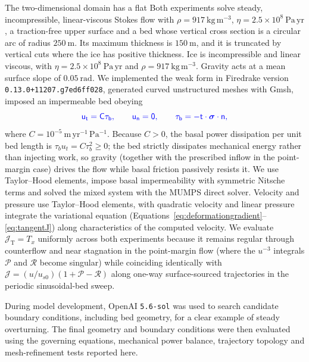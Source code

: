 \documentclass[review]{igs}
\providecommand{\DIFadd}[1]{{\protect\color{blue} \sf #1}} %
\providecommand{\DIFdel}[1]{{\protect\color{red} \scriptsize #1}} %
\providecommand{\DIFaddbegin}{} %
\providecommand{\DIFaddend}{} %
\providecommand{\DIFdelbegin}{} %
\providecommand{\DIFdelend}{} %
\newcommand{\DIFscaledelfig}{0.5}
\newlength{\DIFdelgraphicswidth} %
\newlength{\DIFdelgraphicsheight} %
\newcommand{\DIFaddincludegraphics}[2][]{{\color{blue}\fbox{\DIFOincludegraphics[#1]{#2}}}} %
\newcommand{\DIFdelincludegraphics}[2][]{%
\sbox{\DIFdelgraphicsbox}{\DIFOincludegraphics[#1]{#2}}%
\settoboxwidth{\DIFdelgraphicswidth}{\DIFdelgraphicsbox} %
\settoboxtotalheight{\DIFdelgraphicsheight}{\DIFdelgraphicsbox} %
\scalebox{\DIFscaledelfig}{%
\parbox[b]{\DIFdelgraphicswidth}{\usebox{\DIFdelgraphicsbox}\\[-\baselineskip] \rule{\DIFdelgraphicswidth}{0em}}\llap{\resizebox{\DIFdelgraphicswidth}{\DIFdelgraphicsheight}{%
\setlength{\unitlength}{\DIFdelgraphicswidth}%
\begin{picture}(1,1)%
\thicklines\linethickness{2pt} %
{\color[rgb]{1,0,0}\put(0,0){\framebox(1,1){}}}%
{\color[rgb]{1,0,0}\put(0,0){\line( 1,1){1}}}%
{\color[rgb]{1,0,0}\put(0,1){\line(1,-1){1}}}%
\end{picture}%
}\hspace*{3pt}}} %
} %
\DeclareRobustCommand{\DIFaddbegin}{\DIFOaddbegin \let\includegraphics\DIFaddincludegraphics} %
\DeclareRobustCommand{\DIFaddend}{\DIFOaddend \let\includegraphics\DIFOincludegraphics} %
\DeclareRobustCommand{\DIFdelbegin}{\DIFOdelbegin \let\includegraphics\DIFdelincludegraphics} %
\DeclareRobustCommand{\DIFdelend}{\DIFOaddend \let\includegraphics\DIFOincludegraphics} %
\begin{document}
\DIFdel{The two-dimensional domain has a flat }\DIFdelend \DIFaddbegin \DIFadd{Both experiments solve steady, incompressible, linear-viscous Stokes flow with \(\rho=917~\mathrm{kg\,m^{-3}}\), \(\eta=2.5\times10^8~\mathrm{Pa\,yr}\), a traction-free }\DIFaddend upper surface and \DIFdelbegin \DIFdel{a bed whose vertical cross section is a circular arc of radius \(250~\mathrm{m}\). Its maximum thickness is \(150~\mathrm{m}\), and it is truncated by vertical cuts where the ice has positive thickness. Ice is incompressible and linear viscous, with \(\eta=2.5\times10^8~\mathrm{Pa\,yr}\) and \(\rho=917~\mathrm{kg\,m^{-3}}\). Gravity acts at a mean surface slope of \(0.05~\mathrm{rad}\). We implemented the weak form in Firedrake version \texttt{0.13.0+11207.g7ed6ff028}, generated curved unstructured meshes with Gmsh, imposed }\DIFdelend \DIFaddbegin \DIFadd{an impermeable bed obeying
}\begin{equation}
\DIFadd{u_t=C\tau_b,
\qquad
u_n=0,
\qquad
\tau_b=-\bm{t}\mathbin{\cdot}\bm{\sigma}\mathbin{\cdot}\bm{n},
\label{eq:linearsliding}
}\end{equation}
\DIFadd{where \(C=10^{-5}~\mathrm{m\,yr^{-1}\,Pa^{-1}}\). Because \(C>0\), the basal power dissipation per unit bed length is \(\tau_b u_t=C\tau_b^2\geq0\); the bed strictly dissipates mechanical energy rather than injecting work, so gravity (together with the prescribed inflow in the point-margin case) drives the flow while basal friction passively resists it. We use Taylor--Hood elements, impose }\DIFaddend basal impermeability with symmetric Nitsche terms and \DIFdelbegin \DIFdel{solved the mixed system with the MUMPS direct solver. Velocity and pressure use Taylor--Hood elements, with quadratic velocity and linear pressure}\DIFdelend \DIFaddbegin \DIFadd{integrate the variational equation (Equations~\ref{eq:deformationgradient}--\ref{eq:tangentJ}) along characteristics of the computed velocity. We evaluate \(\mathcal{J}_{\mathrm{T}}=T_x\) uniformly across both experiments because it remains regular through counterflow and near stagnation in the point-margin flow (where the \(u^{-3}\) integrals \(\mathcal{P}\) and \(\mathcal{R}\) become singular) while coinciding identically with \(\mathcal{J}=(u/u_{s0})(1+\mathcal{P}-\mathcal{R})\) along one-way surface-sourced trajectories in the periodic sinusoidal-bed sweep}\DIFaddend .

\DIFdelbegin \DIFdel{During model development, OpenAI \texttt{5.6-sol} was used to search candidate boundary conditions, including bed geometry, for a clear example of steady overturning. The final geometry and boundary conditions were then evaluated using the governing equations, mechanical power balance, trajectory topology and mesh-refinement tests reported here. }%
\end{document}
